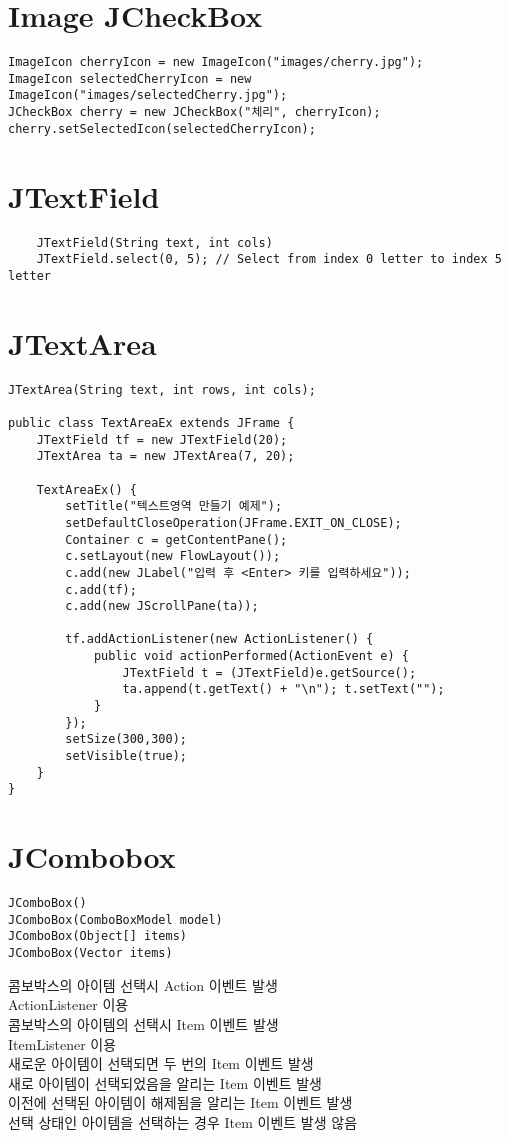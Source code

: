 \section{Image JCheckBox}
\begin{verbatim}
ImageIcon cherryIcon = new ImageIcon("images/cherry.jpg");
ImageIcon selectedCherryIcon = new ImageIcon("images/selectedCherry.jpg");
JCheckBox cherry = new JCheckBox("체리", cherryIcon);
cherry.setSelectedIcon(selectedCherryIcon);
\end{verbatim}

\section{JTextField}
\begin{verbatim}
    JTextField(String text, int cols)
    JTextField.select(0, 5); // Select from index 0 letter to index 5 letter
\end{verbatim}

\section{JTextArea}
\begin{verbatim}
JTextArea(String text, int rows, int cols);

public class TextAreaEx extends JFrame {
    JTextField tf = new JTextField(20);
    JTextArea ta = new JTextArea(7, 20);

    TextAreaEx() {
        setTitle("텍스트영역 만들기 예제");
        setDefaultCloseOperation(JFrame.EXIT_ON_CLOSE);
        Container c = getContentPane();
        c.setLayout(new FlowLayout());
        c.add(new JLabel("입력 후 <Enter> 키를 입력하세요"));
        c.add(tf);
        c.add(new JScrollPane(ta));

        tf.addActionListener(new ActionListener() {
            public void actionPerformed(ActionEvent e) {
                JTextField t = (JTextField)e.getSource();
                ta.append(t.getText() + "\n"); t.setText("");
            }
        });
        setSize(300,300);
        setVisible(true);
    }
}
\end{verbatim}


\section{JCombobox}
\begin{verbatim}
JComboBox()
JComboBox(ComboBoxModel model)
JComboBox(Object[] items)
JComboBox(Vector items)
\end{verbatim}
콤보박스의 아이템 선택시 Action 이벤트 발생\\
ActionListener 이용\\
콤보박스의 아이템의 선택시 Item 이벤트 발생\\
ItemListener 이용\\
새로운 아이템이 선택되면 두 번의 Item 이벤트 발생\\
새로 아이템이 선택되었음을 알리는 Item 이벤트 발생\\
이전에 선택된 아이템이 해제됨을 알리는 Item 이벤트 발생\\
선택 상태인 아이템을 선택하는 경우 Item 이벤트 발생 않음\\

